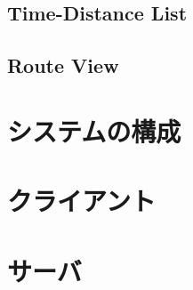 \subsection{Time-Distance List}
\subsection{Route View}

\section{システムの構成}

\section{クライアント}

\section{サーバ}

